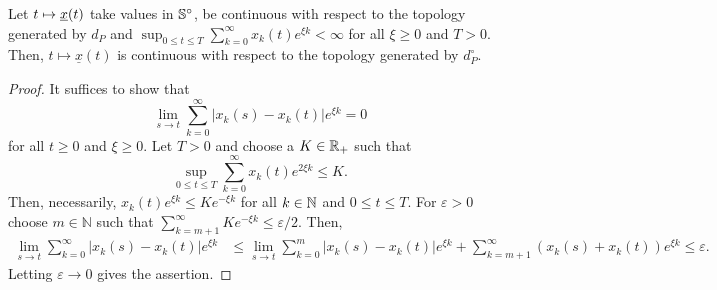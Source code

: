 \begin{Lemma}\label{pre:l:conti_paths}
Let $t\mapsto \underline{x}(t)$ take values in $\mathbb{S}^\circ$,
be continuous with respect to the topology generated by $d_{P}$
and $\sup_{0\leq t\leq T} \sum_{k=0}^\infty x_k(t) e^{\xi
k}<\infty$ for all $\xi\geq 0$ and $T>0$. Then, $t\mapsto
\underline x(t)$ is continuous with respect to the topology
generated by $d_{P}^\circ$.
\end{Lemma}

\begin{proof}
It suffices to show that
$$ \lim_{s\to t} \sum_{k=0}^\infty |x_k(s) - x_k(t)|e^{\xi k} = 0$$ for all $t\geq 0$ and $\xi\geq
0$. Let $T > 0$ and choose a $K \in \mathbb{R}_+$ such that 
$$\sup_{0\leq t\leq T} \sum_{k=0}^\infty x_k(t) e^{2\xi k}\leq K.$$ 
Then, necessarily, $x_k(t)e^{\xi
k} \leq Ke^{-\xi k}$ for all $k \in \mathbb{N}$ and $0\leq t\leq T$. For
      $\varepsilon>0$ choose $m\in\mathbb N$ such that
      $\sum_{k=m+1}^\infty Ke^{-\xi k} \leq \varepsilon/2$. Then,
      \begin{align*}
        \lim_{s\to t} \sum_{k=0}^\infty |x_k(s) - x_k(t)|e^{\xi k} &
        \leq \lim_{s\to t} \sum_{k=0}^m |x_k(s) - x_k(t)|e^{\xi k} +
        \sum_{k=m+1}^\infty (x_k(s)+x_k(t)) e^{\xi k} \leq
        \varepsilon.
      \end{align*}
      Letting $\varepsilon\to 0$ gives the assertion.
     \end{proof}